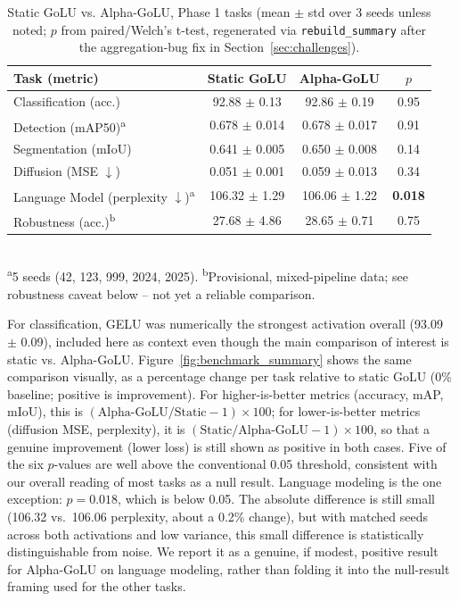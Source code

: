 \documentclass[conference]{IEEEtran}
\begin{document}
\begin{table}[h]
\centering
\caption{Static GoLU vs. Alpha-GoLU, Phase 1 tasks (mean $\pm$ std over 3 seeds unless noted; $p$ from paired/Welch's t-test, regenerated via \texttt{rebuild\_summary} after the aggregation-bug fix in Section~\ref{sec:challenges}).}
\label{tab:results}
\begin{tabular}{@{}lccc@{}}
\toprule
Task (metric) & Static GoLU & Alpha-GoLU & $p$ \\
\midrule
Classification (acc.) & 92.88 $\pm$ 0.13 & 92.86 $\pm$ 0.19 & 0.95 \\
Detection (mAP50)\textsuperscript{a} & 0.678 $\pm$ 0.014 & 0.678 $\pm$ 0.017 & 0.91 \\
Segmentation (mIoU) & 0.641 $\pm$ 0.005 & 0.650 $\pm$ 0.008 & 0.14 \\
Diffusion (MSE $\downarrow$) & 0.051 $\pm$ 0.001 & 0.059 $\pm$ 0.013 & 0.34 \\
Language Model (perplexity $\downarrow$)\textsuperscript{a} & 106.32 $\pm$ 1.29 & 106.06 $\pm$ 1.22 & \textbf{0.018} \\
Robustness (acc.)\textsuperscript{b} & 27.68 $\pm$ 4.86 & 28.65 $\pm$ 0.71 & 0.75 \\
\bottomrule
\end{tabular}
\\[2pt]
{\footnotesize \textsuperscript{a}5 seeds (42, 123, 999, 2024, 2025). \textsuperscript{b}Provisional, mixed-pipeline data; see robustness caveat below -- not yet a reliable comparison.}
\end{table}

For classification, GELU was numerically the strongest activation overall (93.09 $\pm$ 0.09), included here as context even though the main comparison of interest is static vs. Alpha-GoLU. Figure~\ref{fig:benchmark_summary} shows the same comparison visually, as a percentage change per task relative to static GoLU (0\% baseline; positive is improvement). For higher-is-better metrics (accuracy, mAP, mIoU), this is $(\text{Alpha-GoLU}/\text{Static} - 1) \times 100$; for lower-is-better metrics (diffusion MSE, perplexity), it is $(\text{Static}/\text{Alpha-GoLU} - 1) \times 100$, so that a genuine improvement (lower loss) is still shown as positive in both cases. Five of the six $p$-values are well above the conventional 0.05 threshold, consistent with our overall reading of most tasks as a null result. Language modeling is the one exception: $p=0.018$, which is below 0.05. The absolute difference is still small (106.32 vs.\ 106.06 perplexity, about a 0.2\% change), but with matched seeds across both activations and low variance, this small difference is statistically distinguishable from noise. We report it as a genuine, if modest, positive result for Alpha-GoLU on language modeling, rather than folding it into the null-result framing used for the other tasks.
\end{document}
